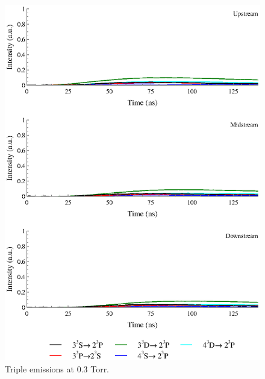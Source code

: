 \begin{figure}
  \centering
  \includegraphics{./chapters/extraem/figures/03torr_t.eps}
  \caption{Triple emissions at 0.3 Torr.}
\end{figure}

